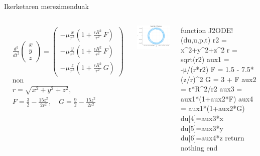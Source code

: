 \documentclass[
 10pt,%
 compress,%
 t,       %
 xcolor=svgnames
]{beamer}
\theoremstyle{definition} \newtheorem{definicion}{Definicion}[section]
\theoremstyle{propiedades} \newtheorem{propiedades}{Propiedades}[section]
\begin{document}
\begin{frame}[fragile]{Ikerketaren merezimenduak}
\begin{columns}
%
\begin{align*}
&\frac{d^2}{dt^2} 
\left(
\begin{matrix}
x \\ y \\ z 
\end{matrix}
\right)
=
\left(
\begin{matrix}
\displaystyle -\mu \frac{x}{r^3} \left(1 + \frac{\epsilon R^2}{r^2}\, F \right)\\ 
\displaystyle -\mu \frac{y}{r^3} \left(1 + \frac{\epsilon R^2}{r^2}\, F \right)\\ 
\displaystyle-\mu \frac{z}{r^3} \left(1 + \frac{\epsilon R^2}{r^2}\, G \right)
\end{matrix}
\right) \\
&\text{non} \\
& r=\sqrt{x^2+y^2+z^2}, \\
& F = \frac{3}{2} -  \frac{15z^2}{2r^2}, \quad
G = \frac{9}{2} - \frac{15z^2}{2r^2}
\end{align*}
%
%
%
%
%

\centering
\begin{minipage}{0.8\textwidth}
	\colorbox{white}  {\includegraphics[width=0.8\linewidth]{J2 VOP Problem}}
\end{minipage}

%
\begin{code}
function J2ODE!(du,u,p,t)
	r2 = x^2+y^2+z^2
	r = sqrt(r2)
	aux1 = -μ/(r*r2)
	F = 1.5 - 7.5*(z/r)^2
	G =  3 + F
	aux2 = ϵ*R^2/r2
	aux3 = aux1*(1+aux2*F)
	aux4 = aux1*(1+aux2*G)
	du[4]=aux3*x
	du[5]=aux3*y
	du[6]=aux4*z
	return nothing
end
\end{code}


\end{columns}
\end{frame}
\end{document}
